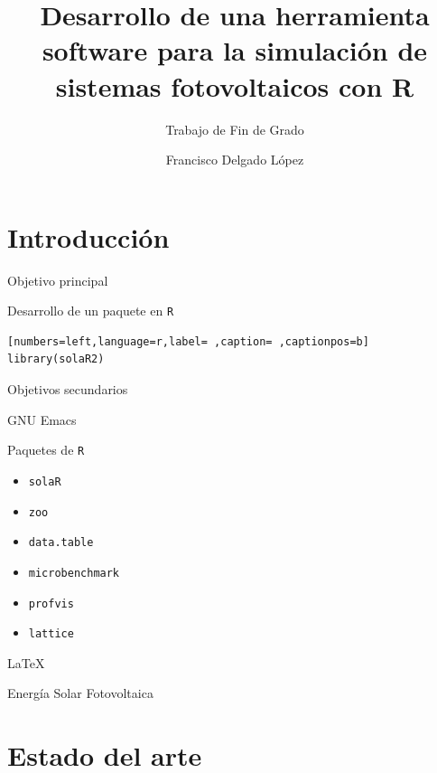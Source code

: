 \documentclass[aspectratio=169, usenames,svgnames,dvipsnames]{beamer}
\author{Francisco Delgado López}
\date{}
\title{Desarrollo de una herramienta software para la simulación de sistemas fotovoltaicos con R}
\subtitle{Trabajo de Fin de Grado}
\institute[UPM]{Universidad Politécnica de Madrid}
\begin{document}
\maketitle

\section{Introducción}
\label{sec:orgefd3b82}
\begin{frame}[label={sec:orgd844b05},fragile]{Objetivo principal}
 \begin{block}{Desarrollo de un paquete en \texttt{R}}
\begin{lstlisting}[numbers=left,language=r,label= ,caption= ,captionpos=b]
library(solaR2)
\end{lstlisting}
\end{block}
\end{frame}

\begin{frame}[label={sec:org08059e0},fragile]{Objetivos secundarios}
 \begin{block}{GNU Emacs}
\end{block}
\begin{block}{Paquetes de \texttt{R}}
\begin{itemize}
\item \texttt{solaR}
\item \texttt{zoo}
\item \texttt{data.table}
\item \texttt{microbenchmark}
\item \texttt{profvis}
\item \texttt{lattice}
\end{itemize}
\end{block}
\begin{block}{\LaTeX{}}
\end{block}
\begin{block}{Energía Solar Fotovoltaica}
\end{block}
\end{frame}

\section{Estado del arte}
\label{sec:org0d44322}
\end{document}
